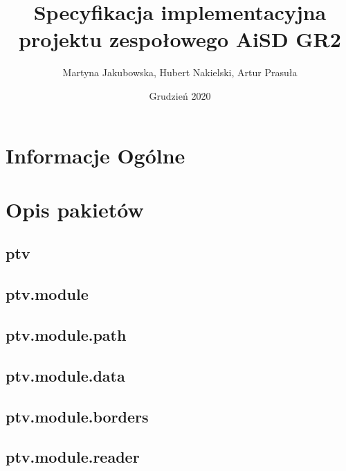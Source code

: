 \documentclass[]{article}
\title{Specyfikacja implementacyjna projektu zespołowego \textbf{AiSD GR2}}
\author{Martyna Jakubowska, Hubert Nakielski, Artur Prasuła}
\date{Grudzień 2020}
\begin{document}
    \maketitle
    
	
    \section{Informacje Ogólne} %
    
    
    \section{Opis pakietów}
        \subsection{ptv}
        \subsection{ptv.module}
        \subsection{ptv.module.path} %
        \subsection{ptv.module.data} %
        \subsection{ptv.module.borders} %
        \subsection{ptv.module.reader} %
        \subsection{ptv.module.simulation} %
        \subsection{ptv.controllers} %
        \subsection{ptv.views} %
        \subsection{ptv.content}
\end{document}
